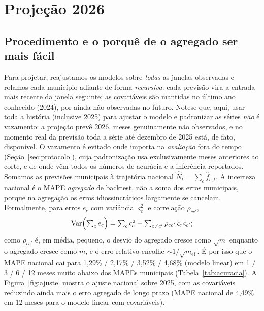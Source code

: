 \documentclass[12pt,a4paper,oneside]{article}
\begin{document}
\section{Projeção 2026}
\label{sec:projecao}

\subsection{Procedimento e o porquê de o agregado ser mais fácil}

Para projetar, reajustamos os modelos sobre \emph{todas} as janelas
observadas e rolamos cada município adiante de forma \emph{recursiva}: cada
previsão vira a entrada mais recente da janela seguinte; as covariáveis são
mantidas no último ano conhecido (2024), por ainda não observadas no
futuro. Note\-se que, aqui, usar toda a história (inclusive 2025) para
ajustar o modelo e padronizar as séries \emph{não} é vazamento: a projeção
prevê 2026, meses genuinamente não observados, e no momento
real da previsão toda a série até dezembro de 2025 está, de fato,
disponível. O vazamento é evitado onde importa \textemdash{} na
\emph{avaliação} fora do tempo (Seção~\ref{sec:protocolo}), cuja
padronização usa exclusivamente meses anteriores ao corte, e de onde vêm
todos os números de acurácia e a inferência reportados. Somamos as previsões municipais à trajetória nacional
$\widehat{N}_t=\sum_c\widehat{f}_{c,t}$. A incerteza nacional é o MAPE
\emph{agregado} de backtest, não a soma dos erros municipais, porque na
agregação os erros idiossincráticos largamente se cancelam. Formalmente,
para erros $e_c$ com variância $\varsigma_c^2$ e correlação $\rho_{cc'}$,
\begin{equation}
\mathrm{Var}\Bigl(\textstyle\sum_c e_c\Bigr)
= \sum_c \varsigma_c^2 + \sum_{c\neq c'}\rho_{cc'}\,\varsigma_c\,\varsigma_{c'} ;
\label{eq:varsoma}
\end{equation}
como $\rho_{cc'}$ é, em média, pequeno, o desvio do agregado cresce como
$\sqrt{m}$ enquanto o agregado cresce como $m$, e o erro relativo encolhe
$\sim 1/\sqrt{m_{\text{ef}}}$. É por isso que o MAPE nacional cai para
1,29\% / 2,17\% / 3,52\% / 4,68\% (modelo linear) em 1 / 3 / 6 / 12 meses
\textemdash{} muito abaixo dos MAPEs municipais
(Tabela~\ref{tab:acuracia}). A Figura~\ref{fig:ajuste} mostra o ajuste
nacional sobre 2025, com as covariáveis reduzindo ainda mais o erro
agregado de longo prazo (MAPE nacional de 4,49\% em 12 meses para o modelo
linear com covariáveis).
\end{document}
